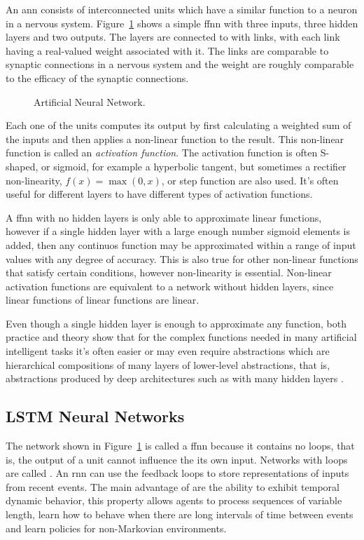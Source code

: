 An \acrshort{ann} consists of interconnected units which have a similar function to a neuron in a nervous system. Figure~\ref{fig:ann} shows a simple \acrfull{ffnn} with three inputs, three hidden layers and two outputs. The layers are connected to with links, with each link having a real-valued weight associated with it. The links are comparable to synaptic connections in a nervous system and the weight are roughly comparable to the efficacy of the synaptic connections.

\begin{figure}[ht]			
	\centering
				
	\caption{Artificial Neural Network\cite{sutton2018reinforcement}.}
	\label{fig:ann}
\end{figure}

Each one of the units computes its output by first calculating a weighted sum of the inputs and then applies a non-linear function to the result. This non-linear function is called an \emph{activation function}. The activation function is often S-shaped, or sigmoid, for example a hyperbolic tangent, but sometimes a rectifier non-linearity, $f(x)=\max(0, x)$, or step function are also used. It's often useful for different layers to have different types of activation functions.

A \acrshort{ffnn} with no hidden layers is only able to approximate linear functions, however if a single hidden layer with a large enough number sigmoid elements is added, then any continuos function may be approximated within a range of input values with any degree of accuracy\cite{cybenko1989approximation}. This is also true for other non-linear functions that satisfy certain conditions, however non-linearity is essential. Non-linear activation functions are equivalent to a network without hidden layers, since linear functions of linear functions are linear. 

Even though a single hidden layer is enough to approximate any function, both practice and theory show that for the complex functions needed in many artificial intelligent tasks it's often easier or may even require abstractions which are hierarchical compositions of many layers of
lower-level abstractions, that is, abstractions produced by deep architectures such as  with many hidden layers \cite{bengio2009learning,sutton2018reinforcement}.


\subsection{LSTM Neural Networks}
The network shown in Figure~\ref{fig:ann} is called a \acrlong{ffnn} because it contains no loops, that is, the output of a unit cannot influence the its own input. Networks with loops are called . An \acrshort{rnn} can use the feedback loops to store representations of inputs from recent events. The main advantage of  are the ability to exhibit temporal dynamic behavior, this property allows agents to process sequences of variable length, learn how to behave when there are long intervals of time between events and learn policies for non-Markovian environments. 

